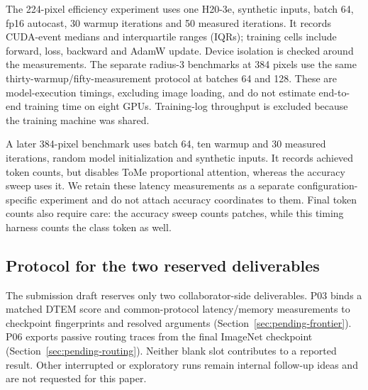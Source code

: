 The 224-pixel efficiency experiment uses one H20-3e, synthetic inputs, batch
64, fp16 autocast, 30 warmup iterations and 50 measured iterations. It records
CUDA-event medians and interquartile ranges (IQRs); training cells include
forward, loss, backward and AdamW update. Device isolation is checked around
the measurements. The separate radius-3 benchmarks at 384 pixels use the
same thirty-warmup/fifty-measurement protocol at batches 64 and 128.
These are model-execution timings, excluding image loading,
and do not estimate end-to-end training time on eight GPUs. Training-log
throughput is excluded because the training machine was shared.

A later 384-pixel benchmark uses batch 64, ten warmup and 30 measured
iterations, random model initialization and synthetic inputs. It records
achieved token counts, but disables ToMe proportional attention, whereas the
accuracy sweep uses it. We retain these latency measurements as a separate
configuration-specific experiment and do not attach accuracy coordinates to
them. Final token counts also require care: the accuracy sweep counts patches,
while this timing harness counts the class token as well.

\subsection{Protocol for the two reserved deliverables}
\label{sec:pending-protocol}

The submission draft reserves only two collaborator-side deliverables. P03
binds a matched DTEM score and common-protocol latency/memory measurements to
checkpoint fingerprints and resolved arguments
(Section~\ref{sec:pending-frontier}). P06 exports passive routing traces from
the final ImageNet checkpoint (Section~\ref{sec:pending-routing}). Neither
blank slot contributes to a reported result. Other interrupted or exploratory
runs remain internal follow-up ideas and are not requested for this paper.
